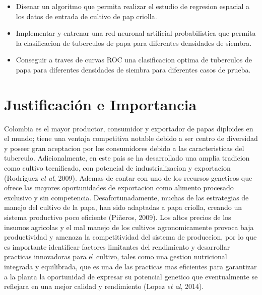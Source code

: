 \begin{itemize}
\item{Disenar un algoritmo que permita realizar el estudio de regresion espacial a los datos de entrada de cultivo de pap criolla.}
\item{Implementar y entrenar una red neuronal artificial probabilistica que permita la clasificacion de tuberculos de papa para diferentes densidades de siembra.}
\item{Conseguir a traves de curvas ROC una clasificacion optima de  tuberculos de papa para diferentes densidades de siembra para diferentes casos de prueba.}
\end{itemize}

\section{Justificaci\'on e Importancia}

Colombia es el mayor productor, consumidor y exportador de papas diploides en el mundo; tiene una ventaja competitiva notable debido a ser centro de diversidad y poseer gran aceptacion por los consumidores debido a las caracteristicas del tuberculo. Adicionalmente, en este pais se ha desarrollado una amplia tradicion como cultivo tecnificado, con potencial de industrializacion y exportacion (Rodriguez \textit{et al}, 2009). Ademas de contar con uno de los recursos geneticos que ofrece las mayores oportunidades de exportacion como alimento procesado exclusivo y sin competencia. Desafortunadamente, muchas de las estrategias de manejo del cultivo de la papa, han sido adaptadas a papa criolla, creando un sistema productivo poco eficiente (Piñeros, 2009). Los altos precios de los insumos agricolas y el mal manejo de los cultivos agronomicamente provoca  baja productividad y amenaza la competitividad del sistema de produccion, por lo que es importante identificar factores limitantes del rendimiento y desarrollar practicas innovadoras para el cultivo, tales como una gestion nutricional integrada y equilibrada, que es una de las practicas mas eficientes para garantizar a la planta la oportunidad de expresar su potencial genetico que eventualmente se reflejara en una mejor calidad y rendimiento (Lopez \textit{et al}, 2014).\\
 
